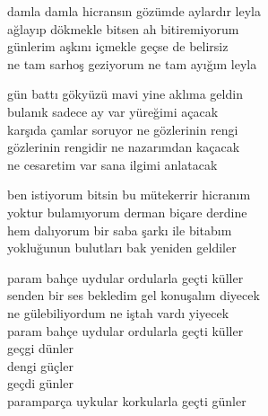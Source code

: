 \documentclass[10pt, openright, oneside]{memoir}
\theoremstyle{definition}
\begin{document}
\vspace*{\fill}
%
\newpage
{}
\vspace*{\fill}
\settowidth{\versewidth}{damla damla hicransın gözümde aylardır leyla}
\begin{cverse}
  damla damla hicransın gözümde aylardır leyla \\
  ağlayıp dökmekle bitsen ah bitiremiyorum \\
  günlerim aşkını içmekle geçse de belirsiz \\
  ne tam sarhoş geziyorum ne tam ayığım leyla
\end{cverse}
\vspace*{\fill}
%
\newpage
{}
\vspace*{\fill}
\settowidth{\versewidth}{karşıda çamlar soruyor ne gözlerinin rengi}
\begin{cverse}
  gün battı gökyüzü mavi yine aklıma geldin \\
  bulanık sadece ay var yüreğimi açacak \\
  karşıda çamlar soruyor ne gözlerinin rengi \\
  gözlerinin rengidir ne nazarımdan kaçacak \\
  ne cesaretim var sana ilgimi anlatacak
\end{cverse}
\vspace*{\fill}
%
\newpage
{}
\vspace*{\fill}
\settowidth{\versewidth}{ben istiyorum bitsin bu mütekerrir hicranım}
\begin{cverse}
  ben istiyorum bitsin bu mütekerrir hicranım \\
  yoktur bulamıyorum derman biçare derdine \\
  hem dalıyorum bir saba şarkı ile bitabım \\
  yokluğunun bulutları bak yeniden geldiler
\end{cverse}
\vspace*{\fill}
%
\newpage
{}
\vspace*{\fill}
\settowidth{\versewidth}{senden bir ses bekledim gel konuşalım diyecek}
\begin{cverse}
  param bahçe uydular ordularla geçti küller \\
  senden bir ses bekledim gel konuşalım diyecek \\
  ne gülebiliyordum ne iştah vardı yiyecek \\
  param bahçe uydular ordularla geçti küller \\
  geçgi dünler \\
  dengi güçler \\
  geçdi günler \\
  paramparça uykular korkularla geçti günler
\end{cverse}
\end{document}
